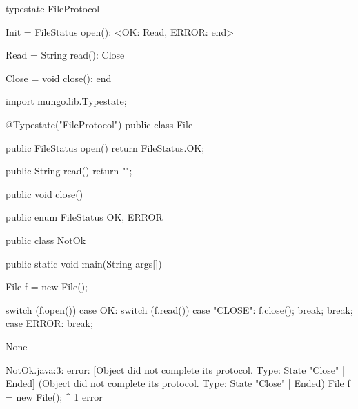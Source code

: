 \begin{code}
typestate FileProtocol {

  Init = {
    FileStatus open(): <OK: Read, ERROR: end>
  }

  Read = {
    String read(): Close
  }

  Close = {
    void close(): end
  }

}\end{code}

\begin{code}
import mungo.lib.Typestate;

@Typestate("FileProtocol")
public class File {

  public FileStatus open() {
    return FileStatus.OK;
  }

  public String read() {
    return "";
  }

  public void close() {

  }

}\end{code}

\begin{code}
public enum FileStatus {
  OK, ERROR
}\end{code}

\begin{code}
public class NotOk {
  public static void main(String args[]) {
    File f = new File();

    switch (f.open()) {
      case OK:
        switch (f.read()) {
          case "CLOSE":
            f.close();
            break;
        }
        break;
      case ERROR:
        break;
    }
  }
}\end{code}

\lstset{language=,caption=Mungo's output}
\begin{code}
None
\end{code}

\lstset{language=,caption=Our tool's output}
\begin{code}
NotOk.java:3: error: [Object did not complete its protocol. Type: State "Close" | Ended] (Object did not complete its protocol. Type: State "Close" | Ended)
    File f = new File();
         ^
1 error
\end{code}

